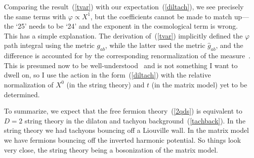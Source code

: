 Comparing the result~(\ref{tvar}) with our
expectation~(\ref{diltach}), we see precisely the same terms
with $\varphi \propto X^1$, but the coefficients cannot be made to
match up---the `25' needs to be `24' and the exponent in the
cosmological term is wrong.  This has a simple explanation.  The
derivation of~(\ref{tvar}) implicitly defined the $\varphi$ path
integral using the metric $g_{ab}$, while the latter used the metric
$\hat g_{ab}$, and the difference is accounted for by the
corresponding renormalization of the measure~\cite{ddk}. 
This is presumed now to be well-understood~\cite{DHddk} and is not
something I want to dwell on, so I use the action in the
form~(\ref{diltach}) with the relative normalization of $X^0$ (in
the string theory) and $t$ (in the matrix model) yet to be
determined.

To summarize, we expect that the free fermion theory~(\ref{2qds}) is
equivalent to $D=2$ string theory in the dilaton and tachyon
background~(\ref{tachback}).  In the string theory we had tachyons
bouncing off a Liouville wall.  In the matrix model we have
fermions bouncing off the inverted harmonic potential.  So things
look very close, the string theory being a bosonization of the matrix
model.

